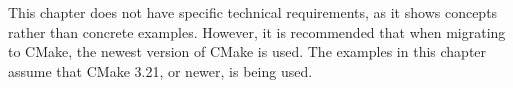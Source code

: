 This chapter does not have specific technical requirements, as it shows concepts rather than concrete examples. However, it is recommended that when migrating to CMake, the newest version of CMake is used. The examples in this chapter assume that CMake 3.21, or newer, is being used.